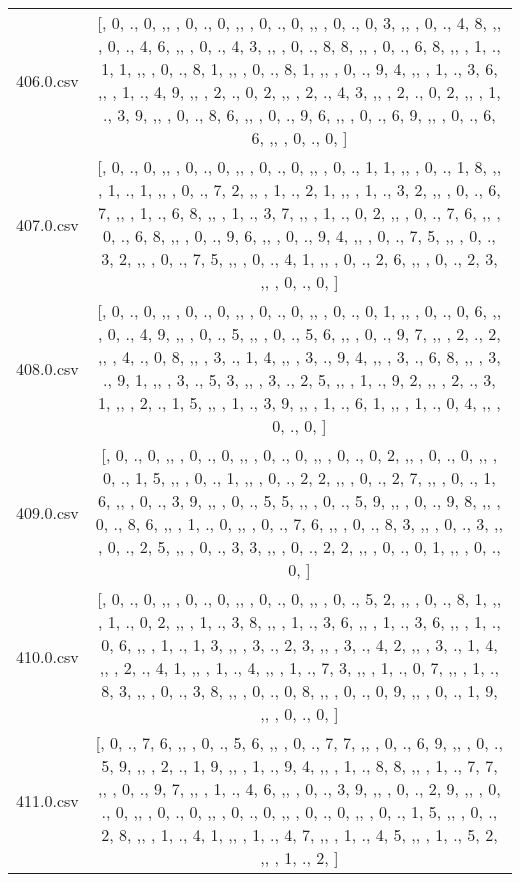 \begin{table}[ht]
\begin{tabular}{@{}c c@{}}
	406.0.csv & [, 0, ., 0, ,,  , 0, ., 0, ,,  , 0, ., 0, ,,  , 0, ., 0, 3, ,,  , 0, ., 4, 8, ,,  , 0, ., 4, 6, ,,  , 0, ., 4, 3, ,,  , 0, ., 8, 8, ,,  , 0, ., 6, 8, ,,  , 1, ., 1, 1, ,,  , 0, ., 8, 1, ,,  , 0, ., 8, 1, ,,  , 0, ., 9, 4, ,,  , 1, ., 3, 6, ,,  , 1, ., 4, 9, ,,  , 2, ., 0, 2, ,,  , 2, ., 4, 3, ,,  , 2, ., 0, 2, ,,  , 1, ., 3, 9, ,,  , 0, ., 8, 6, ,,  , 0, ., 9, 6, ,,  , 0, ., 6, 9, ,,  , 0, ., 6, 6, ,,  , 0, ., 0, ]\\ 
	407.0.csv & [, 0, ., 0, ,,  , 0, ., 0, ,,  , 0, ., 0, ,,  , 0, ., 1, 1, ,,  , 0, ., 1, 8, ,,  , 1, ., 1, ,,  , 0, ., 7, 2, ,,  , 1, ., 2, 1, ,,  , 1, ., 3, 2, ,,  , 0, ., 6, 7, ,,  , 1, ., 6, 8, ,,  , 1, ., 3, 7, ,,  , 1, ., 0, 2, ,,  , 0, ., 7, 6, ,,  , 0, ., 6, 8, ,,  , 0, ., 9, 6, ,,  , 0, ., 9, 4, ,,  , 0, ., 7, 5, ,,  , 0, ., 3, 2, ,,  , 0, ., 7, 5, ,,  , 0, ., 4, 1, ,,  , 0, ., 2, 6, ,,  , 0, ., 2, 3, ,,  , 0, ., 0, ]\\ 
	408.0.csv & [, 0, ., 0, ,,  , 0, ., 0, ,,  , 0, ., 0, ,,  , 0, ., 0, 1, ,,  , 0, ., 0, 6, ,,  , 0, ., 4, 9, ,,  , 0, ., 5, ,,  , 0, ., 5, 6, ,,  , 0, ., 9, 7, ,,  , 2, ., 2, ,,  , 4, ., 0, 8, ,,  , 3, ., 1, 4, ,,  , 3, ., 9, 4, ,,  , 3, ., 6, 8, ,,  , 3, ., 9, 1, ,,  , 3, ., 5, 3, ,,  , 3, ., 2, 5, ,,  , 1, ., 9, 2, ,,  , 2, ., 3, 1, ,,  , 2, ., 1, 5, ,,  , 1, ., 3, 9, ,,  , 1, ., 6, 1, ,,  , 1, ., 0, 4, ,,  , 0, ., 0, ]\\ 
	409.0.csv & [, 0, ., 0, ,,  , 0, ., 0, ,,  , 0, ., 0, ,,  , 0, ., 0, 2, ,,  , 0, ., 0, ,,  , 0, ., 1, 5, ,,  , 0, ., 1, ,,  , 0, ., 2, 2, ,,  , 0, ., 2, 7, ,,  , 0, ., 1, 6, ,,  , 0, ., 3, 9, ,,  , 0, ., 5, 5, ,,  , 0, ., 5, 9, ,,  , 0, ., 9, 8, ,,  , 0, ., 8, 6, ,,  , 1, ., 0, ,,  , 0, ., 7, 6, ,,  , 0, ., 8, 3, ,,  , 0, ., 3, ,,  , 0, ., 2, 5, ,,  , 0, ., 3, 3, ,,  , 0, ., 2, 2, ,,  , 0, ., 0, 1, ,,  , 0, ., 0, ]\\ 
	410.0.csv & [, 0, ., 0, ,,  , 0, ., 0, ,,  , 0, ., 0, ,,  , 0, ., 5, 2, ,,  , 0, ., 8, 1, ,,  , 1, ., 0, 2, ,,  , 1, ., 3, 8, ,,  , 1, ., 3, 6, ,,  , 1, ., 3, 6, ,,  , 1, ., 0, 6, ,,  , 1, ., 1, 3, ,,  , 3, ., 2, 3, ,,  , 3, ., 4, 2, ,,  , 3, ., 1, 4, ,,  , 2, ., 4, 1, ,,  , 1, ., 4, ,,  , 1, ., 7, 3, ,,  , 1, ., 0, 7, ,,  , 1, ., 8, 3, ,,  , 0, ., 3, 8, ,,  , 0, ., 0, 8, ,,  , 0, ., 0, 9, ,,  , 0, ., 1, 9, ,,  , 0, ., 0, ]\\ 
	411.0.csv & [, 0, ., 7, 6, ,,  , 0, ., 5, 6, ,,  , 0, ., 7, 7, ,,  , 0, ., 6, 9, ,,  , 0, ., 5, 9, ,,  , 2, ., 1, 9, ,,  , 1, ., 9, 4, ,,  , 1, ., 8, 8, ,,  , 1, ., 7, 7, ,,  , 0, ., 9, 7, ,,  , 1, ., 4, 6, ,,  , 0, ., 3, 9, ,,  , 0, ., 2, 9, ,,  , 0, ., 0, ,,  , 0, ., 0, ,,  , 0, ., 0, ,,  , 0, ., 0, ,,  , 0, ., 1, 5, ,,  , 0, ., 2, 8, ,,  , 1, ., 4, 1, ,,  , 1, ., 4, 7, ,,  , 1, ., 4, 5, ,,  , 1, ., 5, 2, ,,  , 1, ., 2, ]\\ 

\end{tabular}
\end{table}
